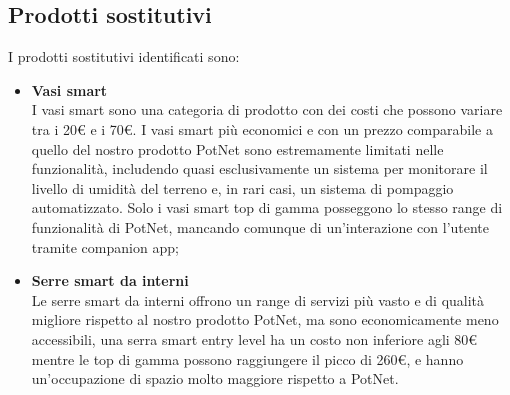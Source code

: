 \subsection{Prodotti sostitutivi}
I prodotti sostitutivi identificati sono:
\begin{itemize}
	\item \textbf{Vasi smart}\\
	I vasi smart sono una categoria di prodotto con dei costi che possono variare tra i 20€ e i 70€. I vasi smart più economici e con un prezzo comparabile a quello del nostro prodotto PotNet sono estremamente limitati nelle funzionalità, includendo quasi esclusivamente un sistema per monitorare il livello di umidità del terreno e, in rari casi, un sistema di pompaggio automatizzato. Solo i vasi smart top di gamma posseggono lo stesso range di funzionalità di PotNet, mancando comunque di un’interazione con l’utente tramite companion app;
	\item \textbf{Serre smart da interni}\\
	Le serre smart da interni offrono un range di servizi più vasto e di qualità migliore rispetto al nostro prodotto PotNet, ma sono economicamente meno accessibili, una serra smart entry level ha un costo non inferiore agli 80€ mentre le top di gamma possono raggiungere il picco di 260€, e hanno un’occupazione di spazio molto maggiore rispetto a PotNet.
\end{itemize}

